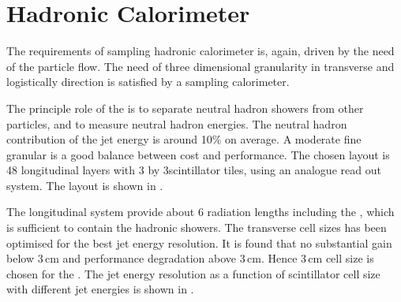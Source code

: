 \section{Hadronic Calorimeter}

The requirements of sampling hadronic calorimeter is, again, driven by the need of the particle flow. The need of three dimensional granularity in transverse and logistically direction is satisfied by a sampling calorimeter. 

  

The principle role of the \HCAL is to separate neutral hadron showers from other particles, and to measure neutral hadron energies. The neutral hadron contribution of  the jet energy is around 10\% on average. A moderate fine  granular \HCAL is a good balance between cost and performance. The chosen layout is 48 longitudinal layers with 3 by 3\cm scintillator tiles, using an analogue read out system. The layout is shown in \Figure{}.

The longitudinal system provide about 6 radiation lengths including the \ECAL, which is sufficient to contain the hadronic showers. The transverse cell sizes has been optimised for the best jet energy resolution. It is found that no substantial gain below 3\,cm and performance degradation above 3\,cm. Hence 3\,cm cell size is chosen for the \HCAL. The jet energy resolution as a function of \HCAL scintillator cell size with different jet energies is shown in \Figure{}.

